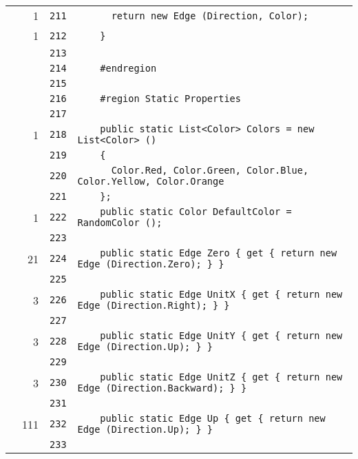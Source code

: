\documentclass[a4paper,10pt]{article}
\begin{document}
\begin{longtable}[l]{lrrl}
\cellcolor{green} & 1 & \verb~211~ & \verb~      return new Edge (Direction, Color);~\\
\cellcolor{green} & 1 & \verb~212~ & \verb~    }~\\
\cellcolor{gray} &  & \verb~213~ & \verb~~\\
\cellcolor{gray} &  & \verb~214~ & \verb~    #endregion~\\
\cellcolor{gray} &  & \verb~215~ & \verb~~\\
\cellcolor{gray} &  & \verb~216~ & \verb~    #region Static Properties~\\
\cellcolor{gray} &  & \verb~217~ & \verb~~\\
\cellcolor{green} & 1 & \verb~218~ & \verb~    public static List<Color> Colors = new List<Color> ()~\\
\cellcolor{gray} &  & \verb~219~ & \verb~    {~\\
\cellcolor{gray} &  & \verb~220~ & \verb~      Color.Red, Color.Green, Color.Blue, Color.Yellow, Color.Orange~\\
\cellcolor{gray} &  & \verb~221~ & \verb~    };~\\
\cellcolor{green} & 1 & \verb~222~ & \verb~    public static Color DefaultColor = RandomColor ();~\\
\cellcolor{gray} &  & \verb~223~ & \verb~~\\
\cellcolor{green} & 21 & \verb~224~ & \verb~    public static Edge Zero { get { return new Edge (Direction.Zero); } }~\\
\cellcolor{gray} &  & \verb~225~ & \verb~~\\
\cellcolor{green} & 3 & \verb~226~ & \verb~    public static Edge UnitX { get { return new Edge (Direction.Right); } }~\\
\cellcolor{gray} &  & \verb~227~ & \verb~~\\
\cellcolor{green} & 3 & \verb~228~ & \verb~    public static Edge UnitY { get { return new Edge (Direction.Up); } }~\\
\cellcolor{gray} &  & \verb~229~ & \verb~~\\
\cellcolor{green} & 3 & \verb~230~ & \verb~    public static Edge UnitZ { get { return new Edge (Direction.Backward); } }~\\
\cellcolor{gray} &  & \verb~231~ & \verb~~\\
\cellcolor{green} & 111 & \verb~232~ & \verb~    public static Edge Up { get { return new Edge (Direction.Up); } }~\\
\cellcolor{gray} &  & \verb~233~ & \verb~~\\

\end{longtable}
\end{document}
